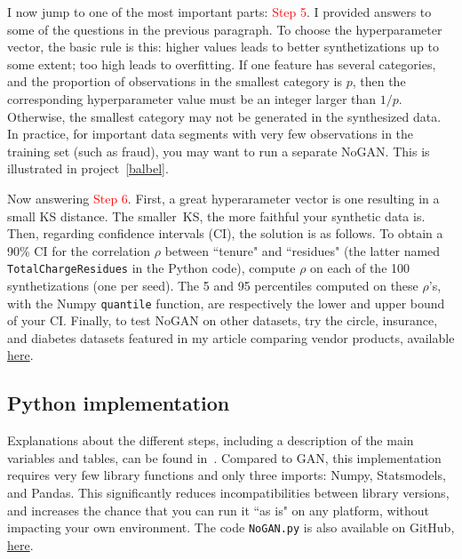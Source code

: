 \documentclass[oneside,10pt]{book}
\begin{document}
I now jump to one of the most important parts: \textcolor{red}{Step 5}. I provided answers to some of the questions in the
 previous paragraph. To choose the hyperparameter vector, the basic rule is this: higher values leads to better synthetizations up to some extent; too high leads to overfitting. If one feature has several categories, and the proportion of observations in the smallest category  is $p$, then the corresponding hyperparameter value must be an integer larger than $1/p$. Otherwise, 
 the smallest category may not be generated in the synthesized data. In practice, for important data segments with very few observations in the training set (such as fraud), 
 you may want to run a separate NoGAN. This is illustrated in project~\ref{balbel}. 

Now answering \textcolor{red}{Step 6}. First, a great hyperarameter vector is one resulting in a small KS distance. The smaller~KS, the more faithful your synthetic data is. Then, regarding \textcolor{index}{confidence intervals} (CI), the solution is as follows. To obtain a 90\% CI for the 
correlation $\rho$ between ``tenure" and ``residues" (the latter named \texttt{TotalChargeResidues} in the Python code),
 compute $\rho$ on each of the 100 synthetizations (one per seed). The 5 and 95 percentiles computed on these $\rho$'s, 
 with the Numpy \texttt{quantile} function, are respectively the lower and upper bound of your CI.
Finally, to test NoGAN on other datasets, try the circle, insurance, and diabetes datasets featured in my article comparing vendor products,
 available \href{https://mltechniques.com/2023/06/16/generative-ai-synthetic-data-vendor-comparison-and-benchmarking-best-practices/}{here}.




\subsection{Python implementation}\label{hs32jnv}

Explanations about the different steps, including a description of the main variables and tables, can be found in~\cite{vgnogan}.
Compared to GAN, this implementation requires very few library functions and only three imports: Numpy, Statsmodels, and Pandas. This significantly reduces
 incompatibilities between library versions, and increases the chance that you can run it ``as is" on any platform, without
 impacting your own environment. The code \texttt{NoGAN.py} is also available on GitHub, \href{https://github.com/VincentGranville/Main/blob/main/NoGAN.py}{here}. \vspace{1ex}
\end{document}
